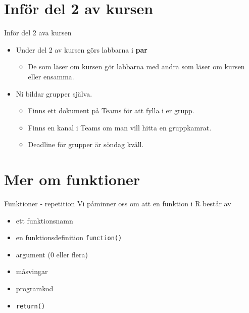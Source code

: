 \documentclass[
  11pt,
  ignorenonframetext,
]{beamer}
\providecommand{\tightlist}{%
  \setlength{\itemsep}{0pt}\setlength{\parskip}{0pt}}
\begin{document}
\hypertarget{infuxf6r-del-2-av-kursen}{%
\section{Inför del 2 av kursen}\label{infuxf6r-del-2-av-kursen}}

\begin{frame}{Inför del 2 ava kursen}
\protect\hypertarget{infuxf6r-del-2-ava-kursen}{}
\begin{itemize}
\tightlist
\item
  Under del 2 av kursen görs labbarna i \textbf{par}

  \begin{itemize}
  \tightlist
  \item
    De som läser om kursen gör labbarna med andra som läser om kursen
    eller ensamma.
  \end{itemize}
\item
  Ni bildar grupper själva.

  \begin{itemize}
  \tightlist
  \item
    Finns ett dokument på Teams för att fylla i er grupp.
  \item
    Finns en kanal i Teams om man vill hitta en gruppkamrat.
  \item
    Deadline för grupper är söndag kväll.
  \end{itemize}
\end{itemize}
\end{frame}

\hypertarget{mer-om-funktioner}{%
\section{Mer om funktioner}\label{mer-om-funktioner}}

\begin{frame}{Funktioner - repetition}
\protect\hypertarget{funktioner---repetition}{}
Vi påminner oss om att en funktion i R består av

\begin{itemize}
\tightlist
\item
  ett funktionsnamn
\item
  en funktionsdefinition \texttt{function()}
\item
  argument (0 eller flera)
\item
  måsvingar
\item
  programkod
\item
  \texttt{return()}
\end{itemize}
\end{frame}
\end{document}
